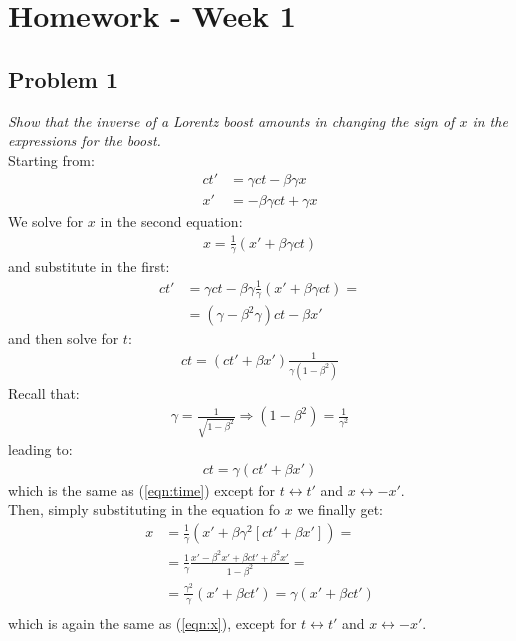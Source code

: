 \documentclass[../template.tex]{subfiles}
\begin{document}
\chapter{Homework - Week 1}

\section{Problem 1}
\textit{Show that the inverse of a Lorentz boost amounts in changing the sign of $x$ in the expressions for the boost.}\\
Starting from:
\begin{align}\label{eqn:time}
    ct' &=  \gamma ct- \beta \gamma x \\
    x' &= -\beta \gamma ct + \gamma x \label{eqn:x}
\end{align} 
We solve for $x$ in the second equation:
\begin{align*}
    x = \frac{1}{\gamma} (x' + \beta \gamma c t) 
\end{align*}
and substitute in the first:
\begin{align*}
    ct' &= \gamma c t - \beta \gamma\frac{1}{\gamma} (x' + \beta \gamma c t) = \\
    &=  (\gamma - \beta^2 \gamma ) ct - \beta x' 
\end{align*}
and then solve for $t$:
\begin{align*}
    ct = (ct' + \beta x') \frac{1}{\gamma (1-\beta^2)} 
\end{align*} 
Recall that:
\begin{align*}
    \gamma = \frac{1}{\sqrt{1-\beta^2}} \Rightarrow (1-\beta^2) = \frac{1}{\gamma^2} 
\end{align*}
leading to:
\begin{align*}
    ct = \gamma(ct' + \beta x')
\end{align*}
which is the same as (\ref{eqn:time}) except for $t \leftrightarrow t'$ and $x \leftrightarrow -x'$.\\
Then, simply substituting in the equation fo $x$ we finally get:
\begin{align*}
    x &= \frac{1}{\gamma}(x' + \beta \gamma^2 [ct' + \beta x']) = \\
    &=  \frac{1}{\gamma} \frac{x' - \beta^2 x' + \beta ct' + \beta^2 x'}{1-\beta^2} = \\
    &= \frac{\gamma^2}{\gamma} (x' + \beta ct') = \gamma (x' + \beta ct')  \\
\end{align*}  
which is again the same as (\ref{eqn:x}), except for $t \leftrightarrow t'$ and $x \leftrightarrow -x'$.\\
\end{document}

